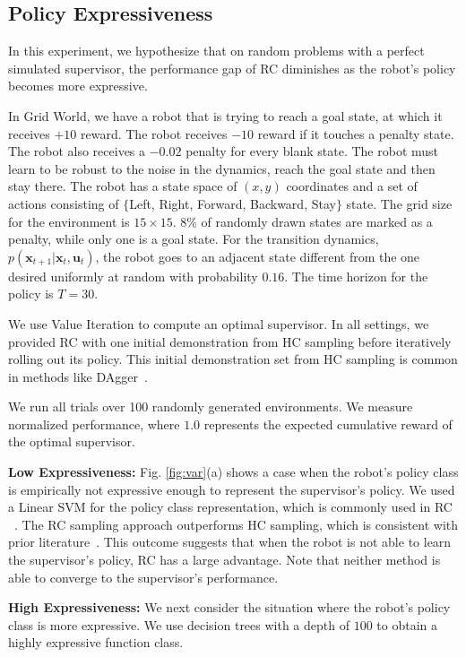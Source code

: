 \documentclass[10pt, conference]{ieeeconf}      %
\newcommand{\bu}{\mathbf{u}}
\newcommand{\bx}{\mathbf{x}}
\begin{document}
\subsection{Policy Expressiveness}\label{sec:gdw}
In this experiment, we hypothesize that on random problems with a perfect simulated supervisor, the performance gap of RC diminishes as the robot's policy becomes more expressive. 

In Grid World, we have a robot that is trying to reach a goal state, at which it receives $+10$ reward. The robot receives $-10$ reward if it touches a penalty state. The robot also receives a $-0.02$ penalty for every blank state. The robot must learn to be robust to the noise in the dynamics, reach the goal state and then stay there.
The robot has a state space of $(x,y)$ coordinates and a set of actions consisting of $\lbrace$Left, Right, Forward, Backward, Stay$\rbrace$ state. The grid size for the environment is $15 \times 15$. $8\%$ of randomly drawn states are marked as a penalty, while only one is a goal state. For the transition dynamics, $p(\bx_{t+1}|\bx_{t},\bu_t)$, the robot goes to an adjacent state different from the one desired uniformly at random with probability $0.16$. The time horizon for the policy is $T=30$. 

We use Value Iteration to compute an optimal supervisor. In all settings, we provided RC with one initial demonstration from HC sampling before iteratively rolling out its policy. This initial demonstration set from HC sampling is common in methods like DAgger~\cite{ross2010reduction}.

We run all trials over 100 randomly generated environments.
We measure normalized performance, where $1.0$ represents the expected cumulative reward of the optimal supervisor.

\noindent \textbf{Low Expressiveness:} Fig. \ref{fig:var}(a) shows a case when the robot's policy class is empirically not expressive enough to represent the supervisor's policy.
We used a Linear SVM for the policy class representation, which is commonly used in RC ~\cite{ross2010efficient,ross2010reduction,ross2013learning}. The RC sampling approach outperforms HC sampling, which is consistent with prior literature~\cite{ross2010efficient,ross2010reduction}.
This outcome suggests that when the robot is not able to learn the supervisor's policy, RC has a large advantage. Note that neither method is able to converge to the supervisor's performance. 

\noindent \textbf{High Expressiveness:}
We next consider the situation where the robot's policy class is more expressive. We use decision trees with a depth of $100$ to obtain a highly expressive function class. 
\end{document}
